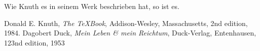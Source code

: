 \documentclass[12pt,ngerman]{scrarticle}
\begin{document}
\blindtext Wie Knuth \cite{knuth} es in seinem Werk beschrieben hat, so ist es.

\blindtext

\blindtext

\begin{thebibliography}{15} 
 Donald E. Knuth, \textit{The \TeX Book},
Addison-Wesley, Massachusetts, 2nd edition, 1984.
 Dagobert Duck, \textit{Mein Leben \& mein Reichtum}, Duck-Verlag, Entenhausen, 123nd edition, 1953
\end{thebibliography}
\end{document}
